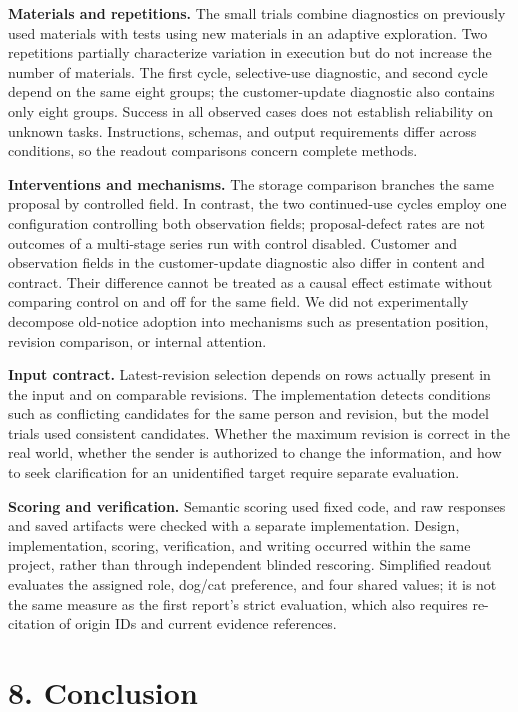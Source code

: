\documentclass[10pt,a4paper]{article}
\begin{document}
\textbf{Materials and repetitions.} The small trials combine diagnostics on previously used materials with tests using new materials in an adaptive exploration. Two repetitions partially characterize variation in execution but do not increase the number of materials. The first cycle, selective-use diagnostic, and second cycle depend on the same eight groups; the customer-update diagnostic also contains only eight groups. Success in all observed cases does not establish reliability on unknown tasks. Instructions, schemas, and output requirements differ across conditions, so the readout comparisons concern complete methods.

\textbf{Interventions and mechanisms.} The storage comparison branches the same proposal by controlled field. In contrast, the two continued-use cycles employ one configuration controlling both observation fields; proposal-defect rates are not outcomes of a multi-stage series run with control disabled. Customer and observation fields in the customer-update diagnostic also differ in content and contract. Their difference cannot be treated as a causal effect estimate without comparing control on and off for the same field. We did not experimentally decompose old-notice adoption into mechanisms such as presentation position, revision comparison, or internal attention.

\textbf{Input contract.} Latest-revision selection depends on rows actually present in the input and on comparable revisions. The implementation detects conditions such as conflicting candidates for the same person and revision, but the model trials used consistent candidates. Whether the maximum revision is correct in the real world, whether the sender is authorized to change the information, and how to seek clarification for an unidentified target require separate evaluation.

\textbf{Scoring and verification.} Semantic scoring used fixed code, and raw responses and saved artifacts were checked with a separate implementation. Design, implementation, scoring, verification, and writing occurred within the same project, rather than through independent blinded rescoring. Simplified readout evaluates the assigned role, dog/cat preference, and four shared values; it is not the same measure as the first report's strict evaluation, which also requires re-citation of origin IDs and current evidence references.

\section{8. Conclusion}\label{paper-02-conclusion}
\end{document}
